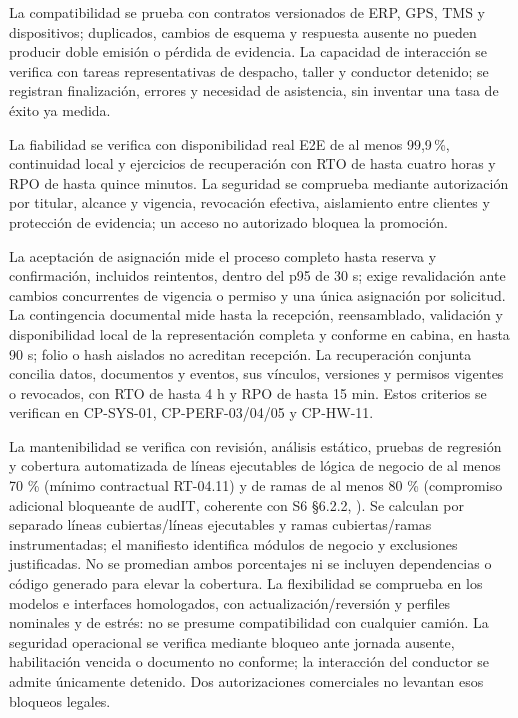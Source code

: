 La compatibilidad se prueba con contratos versionados de ERP, GPS, TMS y dispositivos; duplicados, cambios de esquema y respuesta ausente no pueden producir doble emisión o pérdida de evidencia. La capacidad de interacción se verifica con tareas representativas de despacho, taller y conductor detenido; se registran finalización, errores y necesidad de asistencia, sin inventar una tasa de éxito ya medida.

La fiabilidad se verifica con disponibilidad real E2E de al menos 99,9\,\%, continuidad local y ejercicios de recuperación con RTO de hasta cuatro horas y RPO de hasta quince minutos. La seguridad se comprueba mediante autorización por titular, alcance y vigencia, revocación efectiva, aislamiento entre clientes y protección de evidencia; un acceso no autorizado bloquea la promoción.

La aceptación de asignación mide el proceso completo hasta reserva y confirmación, incluidos reintentos, dentro del p95 de 30 s; exige revalidación ante cambios concurrentes de vigencia o permiso y una única asignación por solicitud. La contingencia documental mide hasta la recepción, reensamblado, validación y disponibilidad local de la representación completa y conforme en cabina, en hasta 90 s; folio o hash aislados no acreditan recepción. La recuperación conjunta concilia datos, documentos y eventos, sus vínculos, versiones y permisos vigentes o revocados, con RTO de hasta 4 h y RPO de hasta 15 min. Estos criterios se verifican en CP-SYS-01, CP-PERF-03/04/05 y CP-HW-11.

La mantenibilidad se verifica con revisión, análisis estático, pruebas de regresión y cobertura automatizada de líneas ejecutables de lógica de negocio de al menos 70 \% (mínimo contractual RT-04.11) y de ramas de al menos 80 \% (compromiso adicional bloqueante de audIT, coherente con S6 §6.2.2, ). Se calculan por separado líneas cubiertas/líneas ejecutables y ramas cubiertas/ramas instrumentadas; el manifiesto identifica módulos de negocio y exclusiones justificadas. No se promedian ambos porcentajes ni se incluyen dependencias o código generado para elevar la cobertura. La flexibilidad se comprueba en los modelos e interfaces homologados, con actualización/reversión y perfiles nominales y de estrés: no se presume compatibilidad con cualquier camión. La seguridad operacional se verifica mediante bloqueo ante jornada ausente, habilitación vencida o documento no conforme; la interacción del conductor se admite únicamente detenido. Dos autorizaciones comerciales no levantan esos bloqueos legales.



